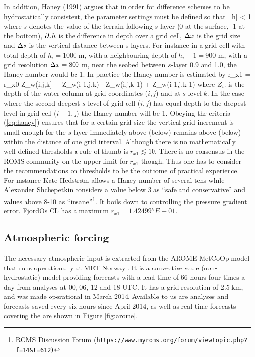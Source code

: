 In addition, Haney (1991) argues that in order for difference schemes to be hydrostatically
consistent, the parameter settings must be defined so that
\be
\label{eq:haney}
 \left|  \px h\right|\frac{\Dx}{\Ds} < 1
\ee
where $s$ denotes the value of the terrain-following $s$-layer (0 at the surface, -1 at the bottom), $\partial_x h$ is the difference in depth over a grid cell, $\Delta x$ is the grid size and $\Delta s$ is the vertical distance between $s$-layers. For instance in a grid cell with total depth of $h_i=1000$ m, with a neighbouring depth of $h_i-1=900$ m, with a grid resolution $\Delta x=800$ m, near the seabed between $s$-layer 0.9 and 1.0, the Haney number would be 1. In practice the Haney number is estimated by
\be
 r_{x1} = r_{x0}
                     {Z_w(i,j,k) + Z_w(i-1,j,k) - Z_w(i,j,k-1) + Z_w(i-1,j,k-1)}
\ee
where $Z_w$ is the depth of the water column at grid coordinates ($i,j$) and at $s$ level $k$. In the case where the second deepest $s$-level of grid cell ($i,j$) has equal depth to the deepest level in grid cell ($i-1,j$) the Haney number will be 1. Obeying the criteria (\ref{eq:haney}) ensures that for a certain grid size the vertical grid increment is small enough for the $s$-layer immediately above (below) remains above (below) within the distance of one grid interval. Although there is no mathematically well-defined thresholds a rule of thumb is $r_{x1} \lesssim 10$. There is no consensus in the ROMS community on the upper limit for $r_{x1}$ though. Thus one has to consider the recommendations on thresholds to be the outcome of practical experience. For instance Kate Hedstr{\o}m allows a Haney number of several tens while Alexander Shchepetkin considers a value below 3 as ``safe and conservative'' and values above 8-10 as ``insane''\footnote{ROMS Discussion Forum (\texttt{https://www.myroms.org/forum/viewtopic.php?f=14\&t=612)}}. It boils down to controlling the pressure gradient error. FjordOs CL has a maximum $r_{x1} = 1.424997E+01$. %

\subsection{Atmospheric forcing}
\label{subsec:atmos}
The necessary atmospheric input is extracted from the AROME-MetCoOp model that runs operationally at MET Norway \citep{mulle:etal:2015}. It is a convective scale (non-hydrostatic) model providing forecasts with a lead time of 66 hours four times a day from analyses at 00, 06, 12 and 18 UTC. It has a grid resolution of 2.5 km, and was made operational in March 2014. Available to us are analyses and forecasts saved every six hours since April 2014, as well as real time forecasts covering the are shown in Figure \ref{fig:arome}.



